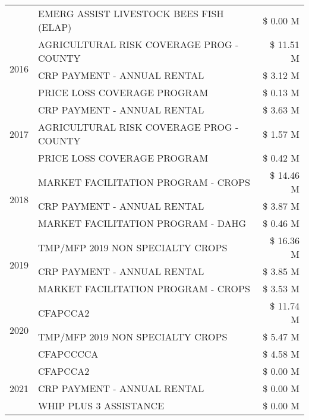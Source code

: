 \begin{tabular}{llr}
 & EMERG ASSIST LIVESTOCK BEES FISH (ELAP) & \$ 0.00 M \\
\cline{1-3}
\multirow[t]{3}{*}{2016} & AGRICULTURAL RISK COVERAGE PROG - COUNTY      & \$ 11.51 M \\
 & CRP PAYMENT - ANNUAL RENTAL                   & \$ 3.12 M \\
 & PRICE LOSS COVERAGE PROGRAM                   & \$ 0.13 M \\
\cline{1-3}
\multirow[t]{3}{*}{2017} & CRP PAYMENT - ANNUAL RENTAL & \$ 3.63 M \\
 & AGRICULTURAL RISK COVERAGE PROG - COUNTY & \$ 1.57 M \\
 & PRICE LOSS COVERAGE PROGRAM & \$ 0.42 M \\
\cline{1-3}
\multirow[t]{3}{*}{2018} & MARKET FACILITATION PROGRAM - CROPS & \$ 14.46 M \\
 & CRP PAYMENT - ANNUAL RENTAL & \$ 3.87 M \\
 & MARKET FACILITATION PROGRAM - DAHG & \$ 0.46 M \\
\cline{1-3}
\multirow[t]{3}{*}{2019} & TMP/MFP 2019 NON SPECIALTY CROPS & \$ 16.36 M \\
 & CRP PAYMENT - ANNUAL RENTAL & \$ 3.85 M \\
 & MARKET FACILITATION PROGRAM - CROPS & \$ 3.53 M \\
\cline{1-3}
\multirow[t]{3}{*}{2020} & CFAPCCA2 & \$ 11.74 M \\
 & TMP/MFP 2019 NON SPECIALTY CROPS & \$ 5.47 M \\
 & CFAPCCCCA & \$ 4.58 M \\
\cline{1-3}
\multirow[t]{3}{*}{2021} & CFAPCCA2 & \$ 0.00 M \\
 & CRP PAYMENT - ANNUAL RENTAL & \$ 0.00 M \\
 & WHIP PLUS 3 ASSISTANCE & \$ 0.00 M \\
\cline{1-3}
\bottomrule
\end{tabular}
